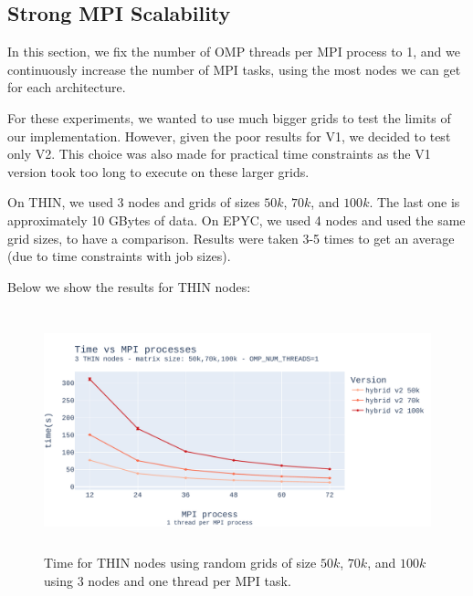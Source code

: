 \documentclass{report}
\begin{document}
\subsection{Strong MPI Scalability}

In this section, we fix the number of OMP threads per MPI process to 1, and we 
continuously increase the number of MPI tasks, using the most nodes we can get 
for each architecture. 

For these experiments, we wanted to use much bigger grids to test the limits 
of our implementation. However, given the poor results for V1, we 
decided to test only V2. This choice was also made for practical time 
constraints as the V1 version took too long to execute on these larger grids. 

On THIN, we used 3 nodes and grids of sizes $50k$, $70k$, and $100k$. The last 
one is approximately 10 GBytes of data. On EPYC, we used 4 nodes and used the 
same grid sizes, to have a comparison. Results were taken 3-5 times to get an 
average (due to time constraints with job sizes).

Below we show the results for THIN nodes:

\begin{figure}[H]
\centering
\includegraphics[width=14cm, height=7cm]{./images/strong_MPI_thin_hybrid.pdf}
\caption{\label{fig:strongmpithinhybrid} Time for THIN nodes using random grids 
of size $50k$, $70k$, and $100k$ using 3 nodes and one thread per MPI task. }
\end{figure}
\end{document}
